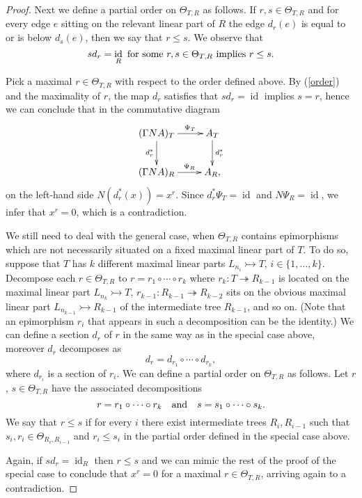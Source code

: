 \documentclass[a4paper]{amsart}
\theoremstyle{plain}
\theoremstyle{definition}
\theoremstyle{remark}
\DeclareMathOperator{\id}{id}
\newcommand{\X}{\Theta}
\numberwithin{equation}{section}
\numberwithin{figure}{section}
\begin{document}
\begin{proof}
Next we define a partial order on $\X_{T,R}$ as follows. If $r,s\in \X_{T,R}$ and for every edge $e$ sitting on the relevant linear part of $R$ the edge $d_r(e)$ is equal to or is below $d_s(e)$, then we say that $r\le s$. We observe that
\begin{equation}\label{order}
sd_r=\id_R \textnormal{ for some } r, s\in \X_{T,R} \textnormal{ implies }r\le s.
\end{equation}

Pick a maximal $r\in \X_{T,R}$ with respect to the order defined above. By (\ref{order}) and the maximality of $r$, the map $d_r$ satisfies
that $sd_r=\id$ implies $s=r$, hence we can conclude that in the commutative diagram
\[
\xymatrix{(\Gamma N A)_T\ar[r]^-{\Psi_T}\ar[d]_{d_r^*} & A_T\ar[d]^{d_r^*}\\
(\Gamma N A)_R\ar[r]^-{\Psi_R} & A_R,}
\]
on the left-hand side $N(d_r^*(x))=x^r$. Since $d_r^*\Psi_T=\id$ and $N\Psi_R=\id$, we infer that $x^r=0$, which is a contradiction.

We still need to deal with the general case, when $\X_{T,R}$ contains epimorphisms which are not necessarily situated on a fixed maximal linear part of $T$. To do so, suppose that $T$ has $k$ different maximal linear parts $L_{n_i}\rightarrowtail T$, $i\in\{1,\ldots,k\}$. Decompose each $r\in \X_{T,R}$ to $r=r_1\circ\cdots\circ r_k$ where $r_k\colon T\twoheadrightarrow R_{k-1}$ is located on the maximal linear part $L_{n_k}\rightarrowtail T$, $r_{k-1}\colon R_{k-1}\twoheadrightarrow R_{k-2}$ sits on the obvious maximal linear part $L_{n_{k-1}}\rightarrowtail R_{k-1}$ of the intermediate tree $R_{k-1}$, and so on. (Note that an epimorphism $r_i$ that appears in such a decomposition can be the identity.) We  can define a section $d_r$ of $r$ in the same way as in the special case above, moreover $d_r$ decomposes as
\[
d_r=d_{r_1}\circ\cdots \circ d_{r_k},
\]
where $d_{r_i}$ is a section of $r_i$. We can define a partial order on $\X_{T,R}$ as follows. Let $r$, $s\in \X_{T,R}$ have the associated decompositions
\[
r=r_1\circ\cdots \circ r_k \quad\textnormal{and}\quad s=s_1\circ\cdots \circ s_k.
\]
We say that $r\le s$ if for every $i$ there exist intermediate trees $R_i, R_{i-1}$ such that $s_i, r_i\in \X_{R_i,R_{i-1}}$ and $r_i\le s_i$ in the partial order defined in the special case above.

Again, if $sd_r=\id_R$ then $r\le s$ and we can mimic the rest of the proof of the special case to conclude that $x^r=0$ for a maximal $r\in \X_{T,R}$, arriving again to a contradiction.
\end{proof}
\end{document}
